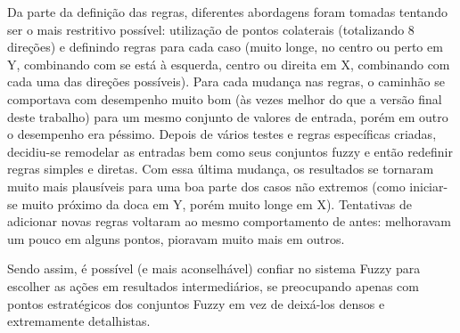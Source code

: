 \documentclass[twocolumn]{article}
\begin{document}
    Da parte da definição das regras, diferentes abordagens foram tomadas
    tentando ser o mais restritivo possível: utilização de pontos colaterais
    (totalizando 8 direções) e definindo regras para cada caso (muito longe, no
    centro ou perto em Y, combinando com se está à esquerda, centro ou direita
    em X, combinando com cada uma das direções possíveis). Para cada mudança
    nas regras, o caminhão se comportava com desempenho muito bom (às vezes
    melhor do que a versão final deste trabalho) para um mesmo conjunto de
    valores de entrada, porém em outro o desempenho era péssimo. Depois de
    vários testes e regras específicas criadas, decidiu-se remodelar as
    entradas bem como seus conjuntos fuzzy e então redefinir regras simples e
    diretas. Com essa última mudança, os resultados se tornaram muito mais
    plausíveis para uma boa parte dos casos não extremos (como iniciar-se muito
    próximo da doca em Y, porém muito longe em X). Tentativas de adicionar
    novas regras voltaram ao mesmo comportamento de antes: melhoravam um pouco
    em alguns pontos, pioravam muito mais em outros.

    Sendo assim, é possível (e mais aconselhável) confiar no sistema Fuzzy para
    escolher as ações em resultados intermediários, se preocupando apenas com
    pontos estratégicos dos conjuntos Fuzzy em vez de deixá-los densos e
    extremamente detalhistas.

    
    
    \nocite{*}
\end{document}
